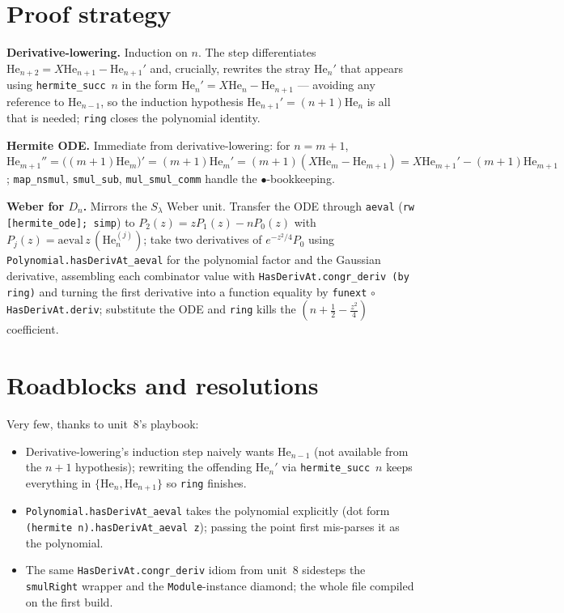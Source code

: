 \documentclass[11pt]{article}
\begin{document}
\section{Proof strategy}
\textbf{Derivative-lowering.} Induction on $n$. The step differentiates
$\mathrm{He}_{n+2}=X\mathrm{He}_{n+1}-\mathrm{He}_{n+1}'$ and, crucially, rewrites the stray
$\mathrm{He}_n'$ that appears using \texttt{hermite\_succ}~$n$ in the form
$\mathrm{He}_n'=X\mathrm{He}_n-\mathrm{He}_{n+1}$ --- avoiding any reference to $\mathrm{He}_{n-1}$, so
the induction hypothesis $\mathrm{He}_{n+1}'=(n+1)\mathrm{He}_n$ is all that is needed; \texttt{ring}
closes the polynomial identity.

\textbf{Hermite ODE.} Immediate from derivative-lowering: for $n=m+1$,
$\mathrm{He}_{m+1}''=\bigl((m+1)\mathrm{He}_m\bigr)'=(m+1)\mathrm{He}_m'=(m+1)(X\mathrm{He}_m
-\mathrm{He}_{m+1})=X\mathrm{He}_{m+1}'-(m+1)\mathrm{He}_{m+1}$; \texttt{map\_nsmul}, \texttt{smul\_sub},
\texttt{mul\_smul\_comm} handle the $\bullet$-bookkeeping.

\textbf{Weber for $D_n$.} Mirrors the $S_\lambda$ Weber unit. Transfer the ODE through \texttt{aeval}
(\texttt{rw [hermite\_ode]; simp}) to $P_2(z)=zP_1(z)-nP_0(z)$ with $P_j(z)=\mathrm{aeval}\,z\,
(\mathrm{He}_n^{(j)})$; take two derivatives of $e^{-z^2/4}P_0$ using
\texttt{Polynomial.hasDerivAt\_aeval} for the polynomial factor and the Gaussian derivative, assembling
each combinator value with \texttt{HasDerivAt.congr\_deriv (by ring)} and turning the first derivative
into a function equality by \texttt{funext}$\,\circ\,$\texttt{HasDerivAt.deriv}; substitute the ODE and
\texttt{ring} kills the $(n+\tfrac12-\tfrac{z^2}{4})$ coefficient.

\section{Roadblocks and resolutions}
Very few, thanks to unit~8's playbook:
\begin{itemize}
\item Derivative-lowering's induction step naively wants $\mathrm{He}_{n-1}$ (not available from the
$n{+}1$ hypothesis); rewriting the offending $\mathrm{He}_n'$ via \texttt{hermite\_succ}~$n$ keeps
everything in $\{\mathrm{He}_n,\mathrm{He}_{n+1}\}$ so \texttt{ring} finishes.
\item \texttt{Polynomial.hasDerivAt\_aeval} takes the polynomial explicitly (dot form
\texttt{(hermite n).hasDerivAt\_aeval z}); passing the point first mis-parses it as the polynomial.
\item The same \texttt{HasDerivAt.congr\_deriv} idiom from unit~8 sidesteps the \texttt{smulRight}
wrapper and the \texttt{Module}-instance diamond; the whole file compiled on the first build.
\end{itemize}
\end{document}
